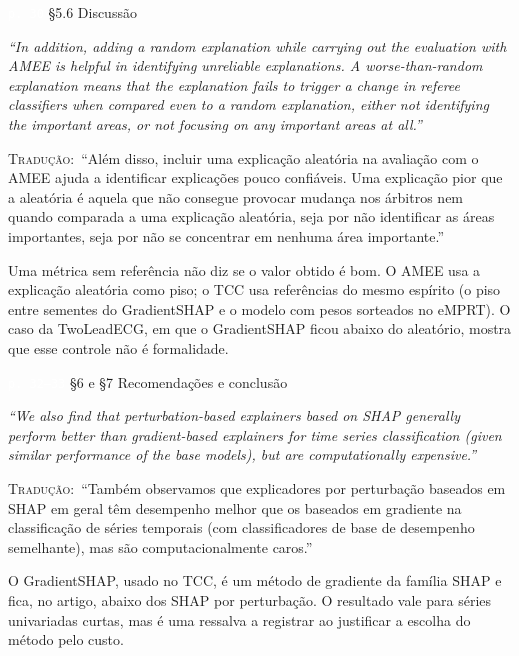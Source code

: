 \documentclass[11pt,a4paper]{article}
\newcommand{\pagechip}[1]{{\setlength{\fboxsep}{1.5pt}\colorbox{cAcc}{\textcolor{white}{\scriptsize\texttt{#1}}}}}
\newenvironment{origquote}{\par\itshape\small}{\par}
\newenvironment{tradquote}{\par\small\textsc{Tradução:}\ }{\par}
\newcommand{\explab}[1]{\par\smallskip{\small\color{cAcc}\textbf{\MakeUppercase{#1}}}\par}
\begin{document}
\begin{citacard}{\pagechip{p. 30} §5.6 Discussão}
\begin{origquote}“In addition, adding a random explanation while carrying out the evaluation with AMEE is helpful in identifying unreliable explanations. A worse-than-random explanation means that the explanation fails to trigger a change in referee classifiers when compared even to a random explanation, either not identifying the important areas, or not focusing on any important areas at all.”\end{origquote}
\begin{tradquote}“Além disso, incluir uma explicação aleatória na avaliação com o AMEE ajuda a identificar explicações pouco confiáveis. Uma explicação pior que a aleatória é aquela que não consegue provocar mudança nos árbitros nem quando comparada a uma explicação aleatória, seja por não identificar as áreas importantes, seja por não se concentrar em nenhuma área importante.”\end{tradquote}
\explab{Explicação}
Uma métrica sem referência não diz se o valor obtido é bom. O AMEE usa a explicação aleatória como piso; o TCC usa referências do mesmo espírito (o piso entre sementes do GradientSHAP e o modelo com pesos sorteados no eMPRT). O caso da TwoLeadECG, em que o GradientSHAP ficou abaixo do aleatório, mostra que esse controle não é formalidade.
\end{citacard}

\begin{citacard}{\pagechip{p. 32--33} §6 e §7 Recomendações e conclusão}
\begin{origquote}“We also find that perturbation-based explainers based on SHAP generally perform better than gradient-based explainers for time series classification (given similar performance of the base models), but are computationally expensive.”\end{origquote}
\begin{tradquote}“Também observamos que explicadores por perturbação baseados em SHAP em geral têm desempenho melhor que os baseados em gradiente na classificação de séries temporais (com classificadores de base de desempenho semelhante), mas são computacionalmente caros.”\end{tradquote}
\explab{Explicação}
O GradientSHAP, usado no TCC, é um método de gradiente da família SHAP e fica, no artigo, abaixo dos SHAP por perturbação. O resultado vale para séries univariadas curtas, mas é uma ressalva a registrar ao justificar a escolha do método pelo custo.
\end{citacard}
\end{document}
